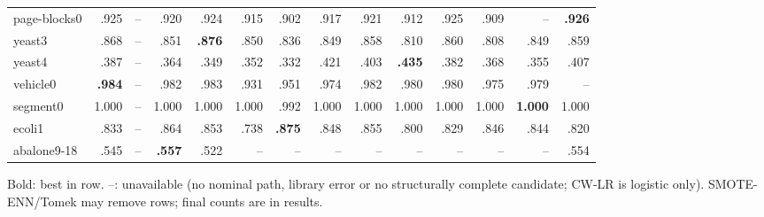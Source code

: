 \begin{table}[!t]
{\begin{tabular}{lrrrrrrrrrrrrr}
page-blocks0 & .925 & -- & .920 & .924 & .915 & .902 & .917 & .921 & .912 & .925 & .909 & -- & \textbf{.926} \\
yeast3 & .868 & -- & .851 & \textbf{.876} & .850 & .836 & .849 & .858 & .810 & .860 & .808 & .849 & .859 \\
yeast4 & .387 & -- & .364 & .349 & .352 & .332 & .421 & .403 & \textbf{.435} & .382 & .368 & .355 & .407 \\
vehicle0 & \textbf{.984} & -- & .982 & .983 & .931 & .951 & .974 & .982 & .980 & .980 & .975 & .979 & -- \\
segment0 & 1.000 & -- & 1.000 & 1.000 & 1.000 & .992 & 1.000 & 1.000 & 1.000 & 1.000 & 1.000 & \textbf{1.000} & 1.000 \\
ecoli1 & .833 & -- & .864 & .853 & .738 & \textbf{.875} & .848 & .855 & .800 & .829 & .846 & .844 & .820 \\
abalone9-18 & .545 & -- & \textbf{.557} & .522 & -- & -- & -- & -- & -- & -- & -- & -- & .554 \\
\bottomrule
\end{tabular}}

\vspace{2pt}\parbox{\textwidth}{\scriptsize Bold: best in row. --: unavailable (no nominal path, library error or no structurally complete candidate; CW-LR is logistic only). SMOTE-ENN/Tomek may remove rows; final counts are in results.}
\end{table}
